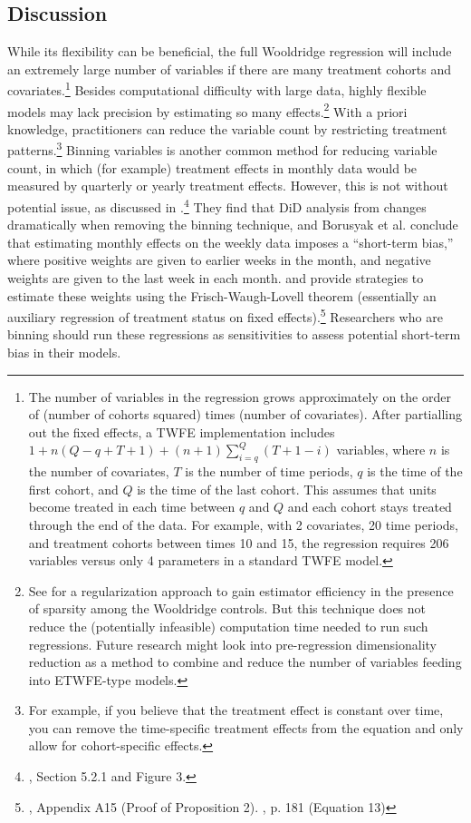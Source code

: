 \documentclass[12pt]{article}
\begin{document}
\subsection{Discussion}
While its flexibility can be beneficial, the full Wooldridge regression will include an extremely large number of variables if there are many treatment cohorts and covariates.\footnote{The number of variables in the regression grows approximately on the order of (number of cohorts squared) times (number of covariates). After partialling out the fixed effects, a TWFE implementation includes $1 + n(Q-q+T+1) + (n+1) \sum_{i=q}^Q(T+1-i)$ variables, where $n$ is the number of covariates, $T$ is the number of time periods, $q$ is the time of the first cohort, and $Q$ is the time of the last cohort. This assumes that units become treated in each time between $q$ and $Q$ and each cohort stays treated through the end of the data. For example, with 2 covariates, 20 time periods, and treatment cohorts between times 10 and 15, the regression requires 206 variables versus only 4 parameters in a standard TWFE model.}  Besides computational difficulty with large data, highly flexible models may lack precision by estimating so many effects.\footnote{See \citet{faletto2023a} for a regularization approach to gain estimator efficiency in the presence of sparsity among the Wooldridge controls. But this technique does not reduce the (potentially infeasible) computation time needed to run such regressions. Future research might look into pre-regression dimensionality reduction as a method to combine and reduce the number of variables feeding into ETWFE-type models.}  With a priori knowledge, practitioners can reduce the variable count by restricting treatment patterns.\footnote{For example, if you believe that the treatment effect is constant over time, you can remove the time-specific treatment effects from the equation and only allow for cohort-specific effects.}  Binning variables is another common method for reducing variable count, in which (for example) treatment effects in monthly data would be measured by quarterly or yearly treatment effects. However, this is not without potential issue, as discussed in \citet{borusyak2024revisiting}.\footnote{\citet{borusyak2024revisiting}, Section 5.2.1 and Figure 3.} They find that DiD analysis from \citet{broda2014} changes dramatically when removing the binning technique, and Borusyak et al. conclude that  estimating monthly effects on the weekly data imposes a “short-term bias,” where positive weights are given to earlier weeks in the month, and negative weights are given to the last week in each month. \citet{borusyak2024revisiting} and \citet{sunabr2021a} provide strategies to estimate these weights using the Frisch-Waugh-Lovell theorem (essentially an auxiliary regression of treatment status on fixed effects).\footnote{\citet{borusyak2024revisiting}, Appendix A15 (Proof of Proposition 2). \citet{sunabr2021a}, p. 181 (Equation 13)}  Researchers who are binning should run these regressions as sensitivities to assess potential short-term bias in their models.
\end{document}
